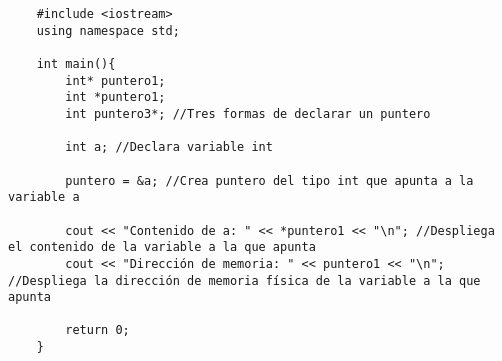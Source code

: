 \begin{lstlisting}
    #include <iostream>
    using namespace std;
    
    int main(){
        int* puntero1;
        int *puntero1;
        int puntero3*; //Tres formas de declarar un puntero
    
        int a; //Declara variable int
    
        puntero = &a; //Crea puntero del tipo int que apunta a la variable a
    
        cout << "Contenido de a: " << *puntero1 << "\n"; //Despliega el contenido de la variable a la que apunta
        cout << "Dirección de memoria: " << puntero1 << "\n"; //Despliega la dirección de memoria física de la variable a la que apunta
        
        return 0;
    }
\end{lstlisting}



